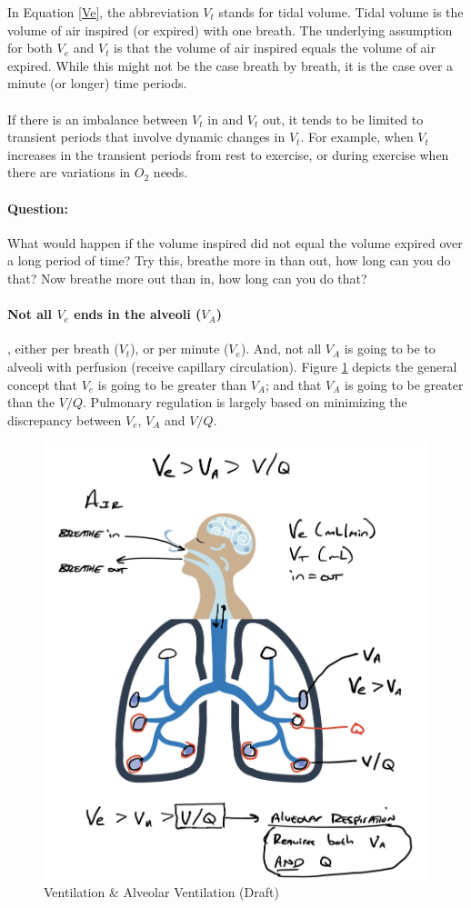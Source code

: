 In Equation \ref{Ve}, the abbreviation $V_t$ stands for tidal volume. Tidal volume is the volume of air inspired (or expired) with one breath. The underlying assumption for both $V_e$ and $V_t$ is that the volume of air inspired equals the volume of air expired. While this might not be the case breath by breath, it is the case over a minute (or longer) time periods.\footnotemark{}

\paragraph{} If there is an imbalance between $V_t$ in and $V_t$ out, it tends to be limited to transient periods that involve dynamic changes in $V_t$. For example, when $V_t$ increases in the transient periods from rest to exercise, or during exercise when there are variations in $O_2$ needs.

\paragraph{Question:} What would happen if the volume inspired did not equal the volume expired over a long period of time? Try this, breathe more in than out, how long can you do that? Now breathe more out than in, how long can you do that?

\paragraph{Not all $V_e$ ends in the alveoli ($V_A$)}, either per breath ($V_t$), or per minute ($V_e$). And, not all $V_A$ is going to be to alveoli with perfusion (receive capillary circulation). Figure \ref{fig:ve_va.jpg} depicts the general concept that $V_e$ is going to be greater than $V_A$; and that $V_A$ is going to be greater than the $V/Q$. Pulmonary regulation is largely based on minimizing the discrepancy between $V_e$, $V_A$ and $V/Q$.

\begin{figure}
    \centering
    \includegraphics[width = 0.5\linewidth]{./figure/ventilation/ve_va.jpg}
    \caption{Ventilation \& Alveolar Ventilation (Draft)}
    \label{fig:ve_va.jpg}
\end{figure}

